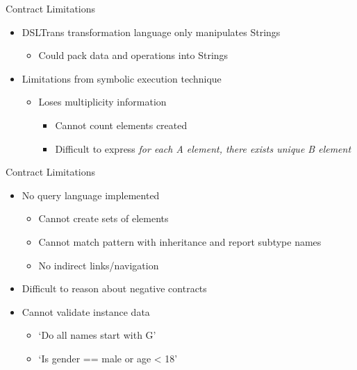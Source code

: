 \documentclass[12pt, handout]{beamer}
\begin{document}
\begin{frame}{Contract Limitations}

\begin{itemize}
\item DSLTrans transformation language only manipulates Strings
\begin{itemize}
\item Could pack data and operations into Strings
\end{itemize}
\end{itemize}

\begin{itemize}
\item Limitations from symbolic execution technique
\begin{itemize}
\item Loses multiplicity information
\begin{itemize}
\item Cannot count elements created
\item Difficult to express \textit{for each A element, there exists unique B element}
\end{itemize}
\end{itemize}
\end{itemize}

\end{frame}

\begin{frame}{Contract Limitations}

\begin{itemize}
\item No query language implemented
\begin{itemize}
\item Cannot create sets of elements
\item Cannot match pattern with inheritance and report subtype names
\item No indirect links/navigation
\end{itemize}
\item Difficult to reason about negative contracts
\item Cannot validate instance data
\begin{itemize}
\item `Do all names start with G'
\item `Is gender == male or age < 18'
\end{itemize}
\end{itemize}

\end{frame}
\end{document}
